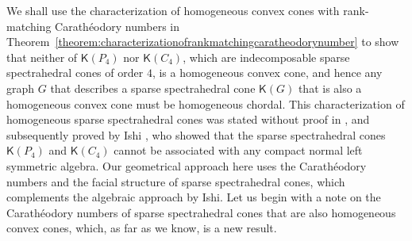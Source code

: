 \documentclass[oneside]{amsart}
\theoremstyle{plain}
\theoremstyle{definition}
\theoremstyle{remark}
\numberwithin{equation}{section}
\begin{document}
We shall use the characterization of homogeneous convex cones with
rank-matching Carath\'eodory numbers in
Theorem~\ref{theorem:characterizationofrankmatchingcaratheodorynumber} to
show that neither of $\mathsf{K}(P_{4})$ nor $\mathsf{K}(C_{4})$, which are
indecomposable sparse spectrahedral cones of order $4$, is a homogeneous
convex cone, and hence any graph $G$ that describes a sparse spectrahedral
cone $\mathsf{K}(G)$ that is also a homogeneous convex cone must be
homogeneous chordal. This characterization of homogeneous sparse
spectrahedral cones was stated without proof in
\cite[Theorem~2.2]{LetMas07}, and subsequently proved by Ishi
\cite[Theorem~A]{Ishi13}, who showed that the sparse spectrahedral cones
$\mathsf{K}(P_{4})$ and $\mathsf{K}(C_{4})$ cannot be associated with any
compact normal left symmetric algebra. Our geometrical approach here uses
the Carath\'eodory numbers and the facial structure of sparse spectrahedral
cones, which complements the algebraic approach by Ishi. Let us begin with
a note on the Carath\'eodory numbers of sparse spectrahedral cones that are
also homogeneous convex cones, which, as far as we know, is a new result.
\end{document}
